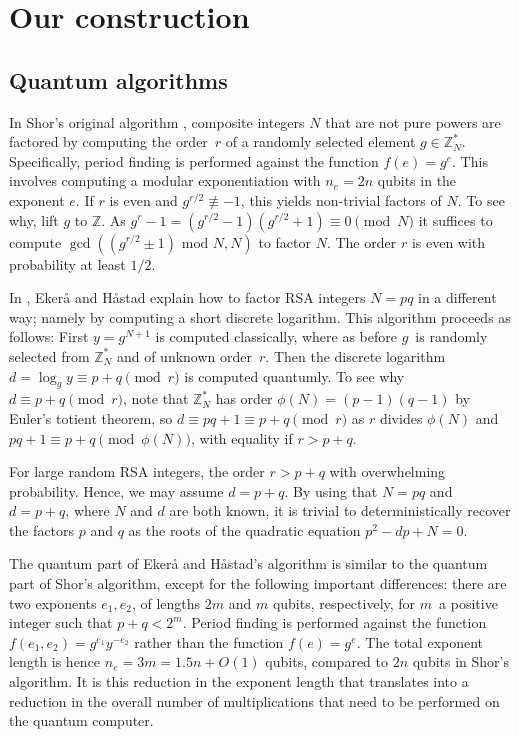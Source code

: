 \documentclass[superscriptaddress,notitlepage,longbibliography]{revtex4-1}
\theoremstyle{definition}
\theoremstyle{definition}
\newcommand{\lenexp}{{n_e}}
\newcommand{\gen}{g}
\begin{document}
\section{Our construction}
\label{sec:construction}

\subsection{Quantum algorithms}

In Shor's original algorithm \cite{shor1994}, composite integers $N$ that are not pure powers are factored by computing the order~$r$ of a randomly selected element $\gen \in \mathbb Z_N^*$.
Specifically, period finding is performed against the function $f(e) = \gen^e$.
This involves computing a modular exponentiation with $\lenexp=2n$ qubits in the exponent $e$.
If $r$ is even and $\gen^{r/2} \not\equiv -1$, this yields non-trivial factors of $N$.
To see why, lift $\gen$ to $\mathbb Z$.
As $\gen^r - 1 = (\gen^{r/2} - 1)(\gen^{r/2} + 1)
\equiv 0 \pmod{N}$ it suffices to compute $\gcd((\gen^{r/2} \pm 1) \text{ mod } N, N)$ to factor $N$.
The order $r$ is even with probability at least $1/2$.


In \cite{ekeraa2016modifying,ekeraa2017quantum,ekeraa2017pp}, Ekerå and Håstad explain how to factor RSA integers $N = pq$ in a different way; namely by computing a short discrete logarithm.
This algorithm proceeds as follows:
First $y = \gen^{N+1}$ is computed classically, where as before $\gen$ is randomly selected from $\mathbb Z_N^*$ and of unknown order~$r$.
Then the discrete logarithm $d = \log_{\gen} y \equiv p + q \pmod{r}$ is computed quantumly.
To see why $d \equiv p + q \pmod{r}$, note that $\mathbb Z_N^*$ has order $\phi(N) = (p-1)(q-1)$ by Euler's totient theorem, so $d \equiv pq + 1 \equiv p + q \pmod{r}$ as $r$ divides $\phi(N)$ and $pq + 1 \equiv p + q \pmod{\phi(N)}$, with equality if $r > p + q$.

For large random RSA integers, the order $r > p + q$ with overwhelming probability.
Hence, we may assume $d = p + q$.
By using that $N = pq$ and $d=p+q$, where $N$ and $d$ are both known, it is trivial to deterministically recover the factors $p$ and $q$ as the roots of the quadratic equation $p^2 - dp + N = 0$.

The quantum part of Ekerå and Håstad's algorithm is similar to the quantum part of Shor's algorithm, except for the following important differences:
there are two exponents $e_1, e_2$, of lengths $2m$ and $m$ qubits, respectively, for $m$ a positive integer such that $p + q < 2^m$.
Period finding is performed against the function $f(e_1, e_2) = \gen^{e_1} y^{-e_2}$ rather than the function $f(e)=\gen^e$.
The total exponent length is hence $n_e = 3m = 1.5n + O(1)$ qubits, compared to $2n$ qubits in Shor's algorithm.
It is this reduction in the exponent length that translates into a reduction in the overall number of multiplications that need to be performed on the quantum computer.
\end{document}
